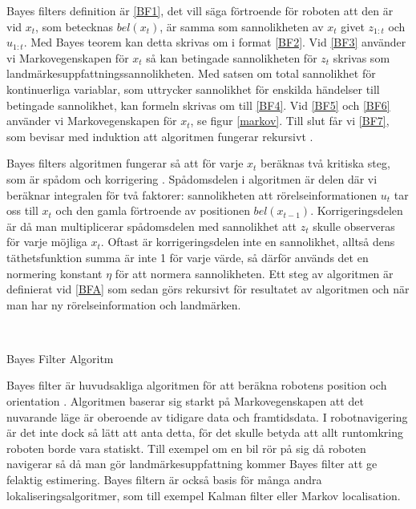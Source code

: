 Bayes filters definition är \ref{BF1}, det vill säga förtroende för roboten att den är vid $x_t$, som betecknas $bel(x_t)$, är samma som sannolikheten av $x_t$ givet $z_{1:t}$ och $u_{1:t}$. Med Bayes teorem kan detta skrivas om i format \ref{BF2}. Vid \ref{BF3} använder vi Markovegenskapen för $x_t$ så kan betingade sannolikheten för $z_t$ skrivas som landmärkesuppfattningssannolikheten. Med satsen om total sannolikhet för kontinuerliga variablar, som uttrycker sannolikhet för enskilda händelser till betingade sannolikhet, kan formeln skrivas om till \ref{BF4}. Vid \ref{BF5} och \ref{BF6} använder vi Markovegenskapen för $x_t$, se figur \ref{markov}. Till slut får vi \ref{BF7}, som bevisar med induktion att algoritmen fungerar rekursivt \citep{ProbabilisticRobotics}.

Bayes filters algoritmen fungerar så att för varje $x_t$ beräknas två kritiska steg, som är spådom och korrigering \citep{ProbabilisticRobotics}. Spådomsdelen i algoritmen är delen där vi beräknar integralen för två faktorer: sannolikheten att rörelseinformationen $u_t$ tar oss till $x_t$ och den gamla förtroende av positionen $bel(x_{t-1})$. Korrigeringsdelen är då man multiplicerar spådomsdelen med sannolikhet att $z_t$ skulle observeras för varje möjliga $x_t$. Oftast är korrigeringsdelen inte en sannolikhet, alltså dens täthetsfunktion summa är inte 1 för varje värde, så därför används det en normering konstant $\eta$ för att normera sannolikheten. Ett steg av algoritmen är definierat vid \ref{BFA} som sedan görs rekursivt för resultatet av algoritmen och när man har ny rörelseinformation och landmärken.

\begin{algorithm}[H]
    \SetAlgoLined
    \label{BFA}
     \\
    \caption{Bayes Filter Algoritm}
\end{algorithm}

Bayes filter är huvudsakliga algoritmen för att beräkna robotens position och orientation \citep{ProbabilisticRobotics}. Algoritmen baserar sig starkt på Markovegenskapen att det nuvarande läge är oberoende av tidigare data och framtidsdata. I robotnavigering är det inte dock så lätt att anta detta, för det skulle betyda att allt runtomkring roboten borde vara statiskt. Till exempel om en bil rör på sig då roboten navigerar så då man gör landmärkesuppfattning kommer Bayes filter att ge felaktig estimering. Bayes filtern är också basis för många andra lokaliseringsalgoritmer, som till exempel Kalman filter eller Markov localisation. 

